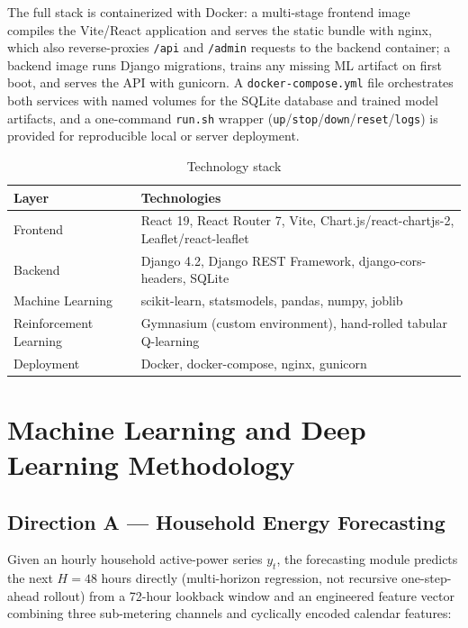 \documentclass[11pt,a4paper]{article}
\begin{document}
The full stack is containerized with Docker: a multi-stage frontend image compiles the Vite/React application and serves the static bundle with nginx, which also reverse-proxies \texttt{/api} and \texttt{/admin} requests to the backend container; a backend image runs Django migrations, trains any missing ML artifact on first boot, and serves the API with gunicorn. A \texttt{docker-compose.yml} file orchestrates both services with named volumes for the SQLite database and trained model artifacts, and a one-command \texttt{run.sh} wrapper (\texttt{up}/\texttt{stop}/\texttt{down}/\texttt{reset}/\texttt{logs}) is provided for reproducible local or server deployment.

\begin{table}[htbp]
\centering
\caption{Technology stack}
\label{tab:stack}
\footnotesize
\renewcommand{\arraystretch}{1.3}
\begin{tabular}{@{}p{2.6cm}p{10cm}@{}}
\toprule
\rowcolor{tablehead}
\textbf{Layer} & \textbf{Technologies} \\
\midrule
Frontend & React 19, React Router 7, Vite, Chart.js/react-chartjs-2, Leaflet/react-leaflet \\
Backend & Django 4.2, Django REST Framework, django-cors-headers, SQLite \\
Machine Learning & scikit-learn, statsmodels, pandas, numpy, joblib \\
Reinforcement Learning & Gymnasium (custom environment), hand-rolled tabular Q-learning \\
Deployment & Docker, docker-compose, nginx, gunicorn \\
\bottomrule
\end{tabular}
\renewcommand{\arraystretch}{1}
\end{table}

\FloatBarrier
\section{Machine Learning and Deep Learning Methodology}

\subsection{Direction A --- Household Energy Forecasting}

Given an hourly household active-power series $y_t$, the forecasting module predicts the next $H=48$ hours directly (multi-horizon regression, not recursive one-step-ahead rollout) from a 72-hour lookback window and an engineered feature vector combining three sub-metering channels and cyclically encoded calendar features:
\end{document}
